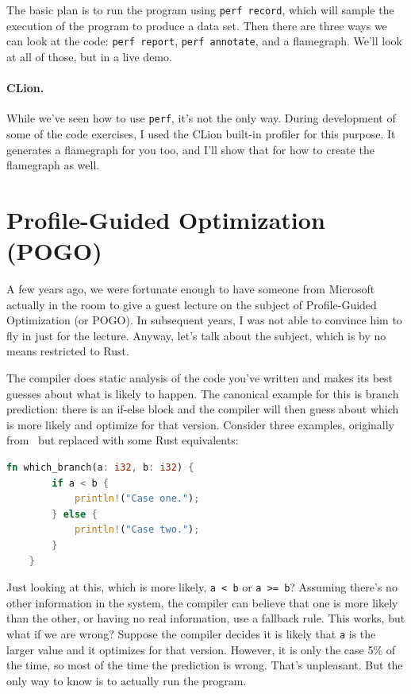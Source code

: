 The basic plan is to run the program using \texttt{perf record}, which will sample the execution of the program to produce a data set. Then there are three ways we can look at the code: \texttt{perf report}, \texttt{perf annotate}, and a flamegraph. We'll look at all of those, but in a live demo.


\paragraph{CLion.} While we've seen how to use \texttt{perf}, it's not the only way. During development of some of the code exercises, I used the CLion built-in profiler for this purpose. It generates a flamegraph for you too, and I'll show that for how to create the flamegraph as well.

\section*{Profile-Guided Optimization (POGO)}

A few years ago, we were fortunate enough to have someone from Microsoft actually in the room to give a guest lecture on the subject of Profile-Guided Optimization (or POGO). In subsequent years, I was not able to convince him to fly in just for the lecture. Anyway, let's talk about the subject, which is by no means restricted to Rust.

The compiler does static analysis of the code you've written and makes its best guesses about what is likely to happen. The canonical example for this is branch prediction: there is an if-else block and the compiler will then guess about which is more likely and optimize for that version. Consider three examples, originally from~\cite{pogo} but replaced with some Rust equivalents:

\begin{lstlisting}[language=Rust]
    fn which_branch(a: i32, b: i32) {
        if a < b {
            println!("Case one.");
        } else {
            println!("Case two.");
        }
    }
\end{lstlisting}

Just looking at this, which is more likely, \texttt{a < b} or \texttt{a >= b}? Assuming there's no other information in the system, the compiler can believe that one is more likely than the other, or having no real information, use a fallback rule. This works, but what if we are wrong? Suppose the compiler decides it is likely that \texttt{a} is the larger value and it optimizes for that version. However, it is only the case 5\% of the time, so most of the time the prediction is wrong. That's unpleasant. But the only way to know is to actually run the program.

